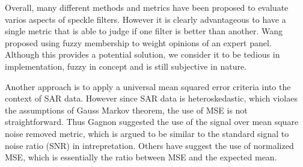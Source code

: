 \documentclass[journal]{IEEEtran}
\begin{document}
Overall, many different methods and metrics have been proposed to evaluate varios aspects of speckle filters. 
However it is clearly advantageous to have a single metric that is able to judge if one filter is better than another. 
Wang \cite{Wang_2005_MIPR} proposed using fuzzy membership to weight opinions of an expert panel. 
Although this provides a potential solution, we consider it to be tedious in implementation, fuzzy in concept and is still subjective in nature.


Another approach is to apply a universal mean squared error criteria into the context of SAR data. 
However since SAR data is heteroskedastic, which violaes the assumptions of Gauss Markov theorem, the use of MSE is not straightforward. 
Thus Gagnon \cite{Gagnon_SPIEProc_1997} suggested the use of the signal over mean square noise removed metric, which is argued to be similar to the standard signal to noise ratio (SNR) in intrepretation. 
Others have suggest the use of normalized MSE, which is essentially the ratio between MSE and the expected mean.

\end{document}
